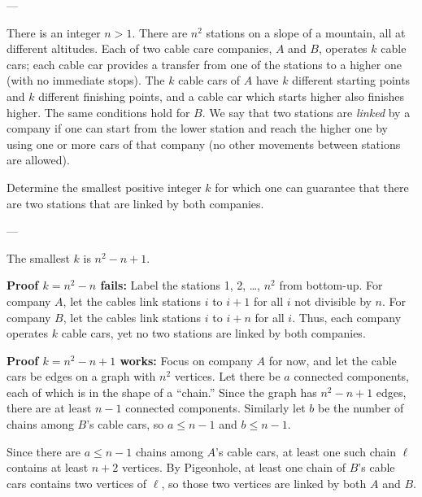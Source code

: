 
---

There is an integer $n>1$. There are $n^2$ stations on a slope of a mountain, all at different altitudes. Each of two cable care companies, $A$ and $B$, operates $k$ cable cars; each cable car provides a transfer from one of the stations to a higher one (with no immediate stops). The $k$ cable cars of $A$ have $k$ different starting points and $k$ different finishing points, and a cable car which starts higher also finishes higher. The same conditions hold for $B$. We say that two stations are \emph{linked} by a company if one can start from the lower station and reach the higher one by using one or more cars of that company (no other movements between stations are allowed).

Determine the smallest positive integer $k$ for which one can guarantee that there are two stations that are linked by both companies.

---

The smallest $k$ is $n^2-n+1$.

\bigskip

\textbf{Proof $k=n^2-n$ fails:} Label the stations 1, 2, \ldots, $n^2$ from bottom-up. For company $A$, let the cables link stations $i$ to $i+1$ for all $i$ not divisible by $n$. For company $B$, let the cables link stations $i$ to $i+n$ for all $i$. Thus, each company operates $k$ cable cars, yet no two stations are linked by both companies.

\bigskip

\textbf{Proof $k=n^2-n+1$ works:} Focus on company $A$ for now, and let the cable cars be edges on a graph with $n^2$ vertices. Let there be $a$ connected components, each of which is in the shape of a ``chain.'' Since the graph has $n^2-n+1$ edges, there are at least $n-1$ connected components. Similarly let $b$ be the number of chains among $B$'s cable cars, so $a\le n-1$ and $b\le n-1$.

Since there are $a\le n-1$ chains among $A$'s cable cars, at least one such chain $\ell$ contains at least $n+2$ vertices. By Pigeonhole, at least one chain of $B$'s cable cars contains two vertices of $\ell$, so those two vertices are linked by both $A$ and $B$.

